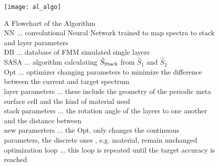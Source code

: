 \begin{figure}[H]
    \centering
    \texttt{[image: al\_algo]}
    \caption{A Flowchart of the Algorithm \\
    NN ... convolutional Neural Network trained to map spectra to stack and layer parameters \\
    DB ... database of FMM simulated single layers \\
    SASA ... algorithm calculating $\hat{S}_{\mathrm{Stack}}$ from $\hat{S}_1$ and $\hat{S}_2$ \\
    Opt ... optimizer changing parameters to minimize the difference between the current and target spectrum \\
    layer parameters ... these include the geometry of the periodic meta surface cell and the kind of material used \\
    stack parameters ... the rotation angle of the layers to one another and the distance between \\
    new paramerters ... the Opt. only changes the continuous parameters, the discrete ones , e.g. material, remain unchanged \\
    optimization loop ... this loop is repeated until the target accuracy is reached}
    \label{fig:al:algo}
\end{figure}
